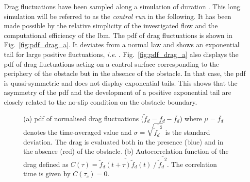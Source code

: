 \documentclass{jfm}
\newcommand{\EL}[1]{{\color{myred}{#1}}}
\begin{document}
Drag fluctuations have been sampled along a simulation of duration \EL{$T_{tot} = 4\times 10^6~T_0$}.
This long simulation will be referred to as the \textit{control run} in the following.
It has been made possible by the relative simplicity of the investigated flow and the computational efficiency of the \ac{lbm}.
The \ac{pdf} of drag fluctuations is shown in Fig.~\ref{fig:pdf_drag_a}.
It deviates from a normal law and shows an exponential tail for large positive fluctuations, \textit{i.e.}  \EL{${\mathbb{P}}(f_d) \propto e^{-\ell f_d}$}.
%
Fig.~\ref{fig:pdf_drag_a} also displays the \ac{pdf} of drag fluctuations acting on a control surface corresponding to the periphery of the obstacle but in the absence of the obstacle. 
%
In that case, the \ac{pdf} is quasi-symmetric and does not display exponential tails. This shows that the asymmetry of the \ac{pdf} and the development of a positive exponential tail are closely related to the no-slip condition on the obstacle boundary.
\begin{figure}
	\centering
	\caption{{(a)} \ac{pdf} of normalised drag fluctuations ($\tilde f_d = f_d - \bar{f_d}$) where $\mu = \bar{f_d}$ denotes the time-averaged value and $\sigma = \sqrt{\overline{{\tilde f_d}^2}}$ is the standard deviation. The drag is evaluated both in the presence (blue) and in the absence (red) of the obstacle. %
		{(b)} Autocorrelation function of the drag defined as $C(\tau) = \overline{ \tilde f_d(t+\tau)\tilde f_d(t)} ~/~ \overline{{\tilde f_d}^2}$. The correlation time \EL{$\tau_c\simeq 4 T_0$} is given by $C(\tau_c)=0$.
	}
	\label{fig:pdf_drag}
\end{figure}
\end{document}
